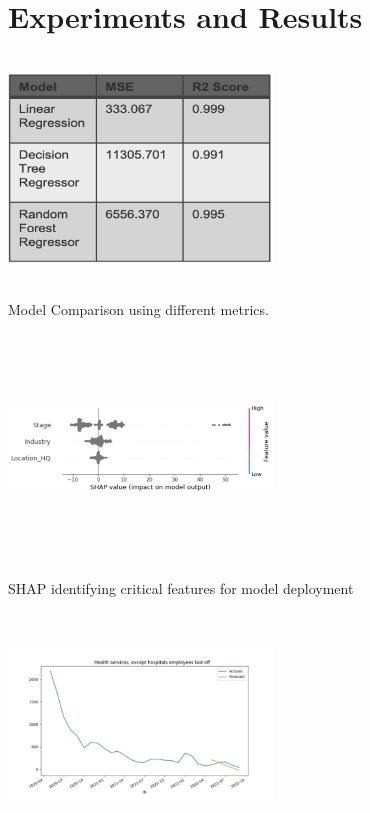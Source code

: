 \documentclass[fleqn,10pt]{SelfArx} %
\begin{document}
\bigskip
\section{Experiments and Results}

\includegraphics[width=7cm, height=6cm]{Picture1.png}

Model Comparison using different metrics.

\includegraphics[width=7cm, height=6cm]{Picture 2.png}

SHAP identifying critical features for model deployment 

\includegraphics[width=7cm, height=6cm]{predict.png}
\end{document}
